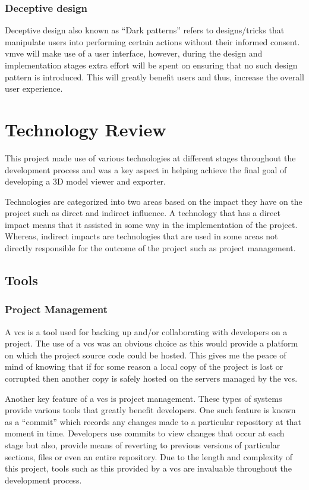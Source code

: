 \documentclass[11pt]{article}
\begin{document}
\subsubsection{Deceptive design}
Deceptive design also known as ``Dark patterns'' refers to designs/tricks that
manipulate users into performing certain actions without their informed consent.
\gls{vmve} will make use of a user interface, however, during the design and
implementation stages extra effort will be spent on ensuring that no such design
pattern is introduced. This will greatly benefit users and thus, increase the
overall user experience.

\section{Technology Review} \label{technology_review}
This project made use of various technologies at different stages throughout the
development process and was a key aspect in helping achieve the final goal of
developing a 3D model viewer and exporter.

Technologies are categorized into two areas based on the impact they have on the
project such as direct and indirect influence. A technology that has a direct
impact means that it assisted in some way in the implementation of the project.
Whereas, indirect impacts are technologies that are used in some areas not
directly responsible for the outcome of the project such as project management.

\subsection{Tools}
\subsubsection{Project Management}
A \gls{vcs} is a tool used for backing up and/or collaborating with developers
on a project. The use of a \gls{vcs} was an obvious choice as this would provide
a platform on which the project source code could be hosted. This gives me the
peace of mind of knowing that if for some reason a local copy of the project is
lost or corrupted then another copy is safely hosted on the servers managed by
the \gls{vcs}.

Another key feature of a \gls{vcs} is project management. These types of systems
provide various tools that greatly benefit developers. One such feature is known
as a ``commit'' which records any changes made to a particular repository at
that moment in time. Developers use commits to view changes that occur at each
stage but also, provide means of reverting to previous versions of particular
sections, files or even an entire repository. Due to the length and complexity
of this project, tools such as this provided by a \gls{vcs} are invaluable
throughout the development process.
\end{document}
